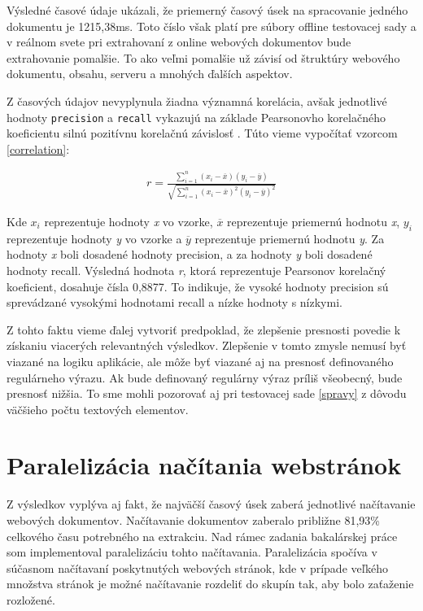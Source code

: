 Výsledné časové údaje ukázali, že priemerný časový úsek na spracovanie jedného dokumentu je 1215,38ms. Toto číslo však platí pre súbory offline testovacej sady a v reálnom svete pri extrahovaní z online webových dokumentov bude extrahovanie pomalšie. To ako veľmi pomalšie už závisí od štruktúry webového dokumentu, obsahu, serveru a mnohých ďalších aspektov.

Z časových údajov nevyplynula žiadna významná korelácia, avšak jednotlivé hodnoty \texttt{precision} a \texttt{recall} vykazujú na základe Pearsonovho korelačného koeficientu silnú pozitívnu korelačnú závislosť \cite{statistics}. Túto vieme vypočítať vzorcom \ref{correlation}:

\begin{eqnarray}
\label{correlation}
    r = \frac{{}\sum_{i=1}^{n} (x_i - \overline{x})(y_i - \overline{y})}
{\sqrt{\sum_{i=1}^{n} (x_i - \overline{x})^2(y_i - \overline{y})^2}}
    \end{eqnarray}

Kde $x_i$ reprezentuje hodnoty \textit{x} vo vzorke, $\overline{x}$ reprezentuje priemernú hodnotu \textit{x}, $y_i$ reprezentuje hodnoty \textit{y} vo vzorke a $\overline{y}$ reprezentuje priemernú hodnotu \textit{y}. Za hodnoty \textit{x} boli dosadené hodnoty precision, a za hodnoty \textit{y} boli dosadené hodnoty recall. Výsledná hodnota \textit{r}, ktorá reprezentuje Pearsonov korelačný koeficient, dosahuje čísla 0,8877. To indikuje, že vysoké hodnoty precision sú sprevádzané vysokými hodnotami recall a nízke hodnoty s nízkymi. 

Z tohto faktu vieme ďalej vytvoriť predpoklad, že zlepšenie presnosti povedie k získaniu viacerých relevantných výsledkov. Zlepšenie v tomto zmysle nemusí byť viazané na logiku aplikácie, ale môže byť viazané aj na presnosť definovaného regulárneho výrazu. Ak bude definovaný regulárny výraz príliš všeobecný, bude presnosť nižšia. To sme mohli pozorovať aj pri testovacej sade  \ref{spravy} z dôvodu väčšieho počtu textových elementov.

\section{Paralelizácia načítania webstránok}

Z výsledkov vyplýva aj fakt, že najväčší časový úsek zaberá jednotlivé načítavanie webových dokumentov. Načítavanie dokumentov zaberalo približne 81,93\% celkového času potrebného na extrakciu. Nad rámec zadania bakalárskej práce som implementoval paralelizáciu tohto načítavania. Paralelizácia spočíva v súčasnom načítavaní poskytnutých webových stránok, kde v prípade veľkého množstva stránok je možné načítavanie rozdeliť do skupín tak, aby bolo zaťaženie rozložené.

